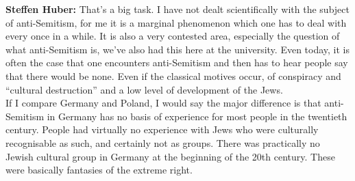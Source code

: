 \textbf{Steffen Huber:} That's a big task. I have not dealt scientifically with the subject of anti-Semitism, for me it is a marginal phenomenon which one has to deal with every once in a while. It is also a very contested area, especially the question of what anti-Semitism is, we’ve also had this here at the university. Even today, it is often the case that one encounters anti-Semitism and then has to hear people say that there would be none. Even if the classical motives occur, of conspiracy and ``cultural destruction'' and a low level of development of the Jews. \\
If I compare Germany and Poland, I would say the major difference is that anti-Semitism in Germany has no basis of experience for most people in the twentieth century. People had virtually no experience with Jews who were culturally recognisable as such, and certainly not as groups. There was practically no Jewish cultural group in Germany at the beginning of the 20th century. These were basically fantasies of the extreme right.\\
